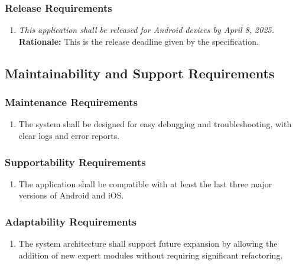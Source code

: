 \documentclass[]{article}
\begin{document}
\subsubsection{Release Requirements}
\label{ssub:release_requirements}
\begin{enumerate}[{OE-R}1. ]
	\item \textit{This application shall be released for Android devices by April 8, 2025.} \\ \textbf{Rationale:} This is the release deadline given by the specification.
\end{enumerate}


\subsection{Maintainability and Support Requirements}
\label{sub:maintainability_and_support_requirements}

\subsubsection{Maintenance Requirements}
\label{ssub:maintenance_requirements}
\begin{enumerate}[{MS-M}1. ]
	\item The system shall be designed for easy debugging and troubleshooting, with clear logs and error reports.
\end{enumerate}

\subsubsection{Supportability Requirements}
\label{ssub:supportability_requirements}
\begin{enumerate}[{MS-S}1. ]
	\item The application shall be compatible with at least the last three major versions of Android and iOS.
\end{enumerate}

\subsubsection{Adaptability Requirements}
\label{ssub:adaptability_requirements}
\begin{enumerate}[{MS-A}1. ]
	\item The system architecture shall support future expansion by allowing the addition of new expert modules without requiring significant refactoring.
\end{enumerate}
\end{document}
